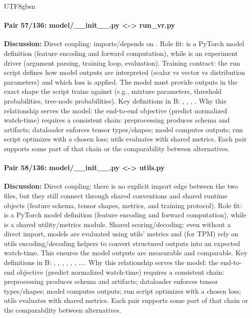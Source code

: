 \documentclass[11pt]{article}
\begin{document}
\begin{CJK*}{UTF8}{gbsn}
\paragraph{Pair 57/136: model/\_\_init\_\_.py <-> run\_vr.py}
\textbf{Discussion:} Direct coupling: \texttt{} imports/depends on \texttt{}. Role fit: \texttt{} is a PyTorch model definition (feature encoding and forward computation), while \texttt{} is an experiment driver (argument parsing, training loop, evaluation). Training contract: the run script defines how model outputs are interpreted (scalar vs vector vs distribution parameters) and which loss is applied. The model must provide outputs in the exact shape the script trains against (e.g., mixture parameters, threshold probabilities, tree-node probabilities). Key definitions in B: \texttt{}, \texttt{}, \texttt{}, \texttt{}. Why this relationship serves the model: the end-to-end objective (predict normalized watch-time) requires a consistent chain: preprocessing produces schema and artifacts; dataloader enforces tensor types/shapes; model computes outputs; run script optimizes with a chosen loss; utils evaluates with shared metrics. Each pair supports some part of that chain or the comparability between alternatives.

\paragraph{Pair 58/136: model/\_\_init\_\_.py <-> utils.py}
\textbf{Discussion:} Direct coupling: there is no explicit import edge between the two files, but they still connect through shared conventions and shared runtime objects (feature schema, tensor shapes, metrics, and training protocol). Role fit: \texttt{} is a PyTorch model definition (feature encoding and forward computation), while \texttt{} is a shared utility/metrics module. Shared scoring/decoding: even without a direct import, models are evaluated using utils' metrics and (for TPM) rely on utils encoding/decoding helpers to convert structured outputs into an expected watch-time. This ensures the model outputs are measurable and comparable. Key definitions in B: \texttt{}, \texttt{}, \texttt{}, \texttt{}, \texttt{}, \texttt{}, .... Why this relationship serves the model: the end-to-end objective (predict normalized watch-time) requires a consistent chain: preprocessing produces schema and artifacts; dataloader enforces tensor types/shapes; model computes outputs; run script optimizes with a chosen loss; utils evaluates with shared metrics. Each pair supports some part of that chain or the comparability between alternatives.


\end{CJK*}
\end{document}
